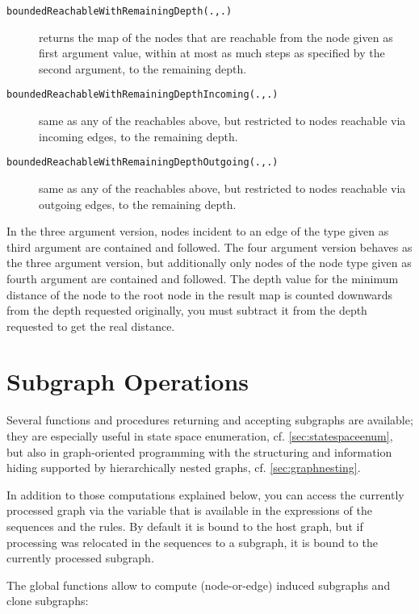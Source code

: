 \begin{description}
\item[\texttt{boundedReachableWithRemainingDepth(.,.)}] returns the map of the nodes that are reachable from the node given as first argument value, within at most as much steps as specified by the second argument, to the remaining depth.
\item[\texttt{boundedReachableWithRemainingDepthIncoming(.,.)}] same as any of the reachables above, but restricted to nodes reachable via incoming edges, to the remaining depth.
\item[\texttt{boundedReachableWithRemainingDepthOutgoing(.,.)}] same as any of the reachables above, but restricted to nodes reachable via outgoing edges, to the remaining depth.
\end{description}

In the three argument version, nodes incident to an edge of the type given as third argument are contained and followed.
The four argument version behaves as the three argument version, but additionally only nodes of the node type given as fourth argument are contained and followed.
The depth value for the minimum distance of the node to the root node in the result map is counted downwards from the depth requested originally, you must subtract it from the depth requested to get the real distance.

\section{Subgraph Operations}\label{sec:subgraphop}

Several functions and procedures returning and accepting subgraphs are available;
they are especially useful in state space enumeration, cf. \ref{sec:statespaceenum}, but also in graph-oriented programming with the structuring and information hiding supported by hierarchically nested graphs, cf. \ref{sec:graphnesting}.

In addition to those computations explained below, you can access the currently processed graph via the  \texttt{} variable that is available in the expressions of the sequences and the rules. 
By default it is bound to the host graph, but if processing was relocated in the sequences to a subgraph, it is bound to the currently processed subgraph.

The global functions allow to compute (node-or-edge) induced subgraphs and clone subgraphs:

